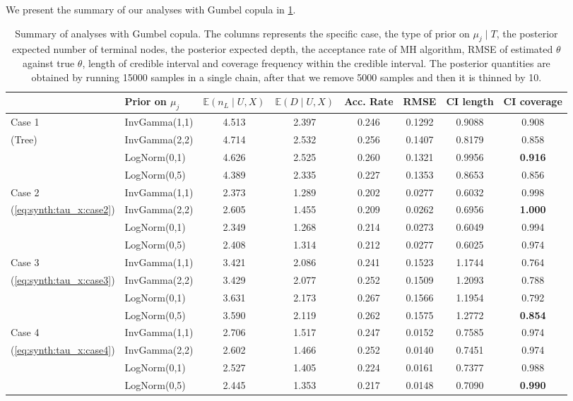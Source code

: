 \documentclass{amsart}
\begin{document}
We present the summary of our analyses with Gumbel copula in \cref{tab:gumbel:summary}. 


\begin{table}[ht]
	\centering
	\caption{Summary of analyses with Gumbel copula. The columns represents the specific case, the type of prior on $\mu_j\mid T$, the posterior expected number of terminal nodes, the posterior expected depth, the acceptance rate of MH algorithm, RMSE of estimated $\theta$ against true $\theta$, length of credible interval and coverage frequency within the credible interval. The posterior quantities are obtained by running 15000 samples in a single chain, after that we remove 5000 samples and then it is thinned by 10.}
	\label{tab:gumbel:summary}
	\scriptsize{
	\begin{tabular}{ll|cccccc}
		\toprule
		& Prior on $\mu_j$ & $\mathbb{E}(n_L\mid U,X)$ & $\mathbb{E}(D\mid U,X)$ & Acc. Rate & RMSE & CI length & CI coverage \\ 
		\midrule
		Case 1 & InvGamma(1,1) & 4.513 & 2.397 & 0.246 & 0.1292 & 0.9088 & 0.908 \\ 
		(Tree) & InvGamma(2,2) & 4.714 & 2.532 & 0.256 & 0.1407 & 0.8179 & 0.858 \\ 
		& LogNorm(0,1) & 4.626 & 2.525 & 0.260 & 0.1321 & 0.9956 & \textbf{0.916} \\ 
		& LogNorm(0,5) & 4.389 & 2.335 & 0.227 & 0.1353 & 0.8653 & 0.856 \\ 
		\midrule
		Case 2 & InvGamma(1,1) & 2.373 & 1.289 & 0.202 & 0.0277 & 0.6032 & 0.998 \\ 
		(\cref{eq:synth:tau_x:case2}) & InvGamma(2,2) & 2.605 & 1.455 & 0.209 & 0.0262 & 0.6956 & \textbf{1.000} \\ 
		& LogNorm(0,1) & 2.349 & 1.268 & 0.214 & 0.0273 & 0.6049 & 0.994 \\ 
		& LogNorm(0,5) & 2.408 & 1.314 & 0.212 & 0.0277 & 0.6025 & 0.974 \\ 
		\midrule
		Case 3 & InvGamma(1,1) & 3.421 & 2.086 & 0.241 & 0.1523 & 1.1744 & 0.764 \\ 
		(\cref{eq:synth:tau_x:case3}) & InvGamma(2,2) & 3.429 & 2.077 & 0.252 & 0.1509 & 1.2093 & 0.788 \\ 
		& LogNorm(0,1) & 3.631 & 2.173 & 0.267 & 0.1566 & 1.1954 & 0.792 \\ 
		& LogNorm(0,5) & 3.590 & 2.119 & 0.262 & 0.1575 & 1.2772 & \textbf{0.854} \\ 
		\midrule
		Case 4 & InvGamma(1,1) & 2.706 & 1.517 & 0.247 & 0.0152 & 0.7585 & 0.974 \\ 
		(\cref{eq:synth:tau_x:case4}) & InvGamma(2,2) & 2.602 & 1.466 & 0.252 & 0.0140 & 0.7451 & 0.974 \\ 
		& LogNorm(0,1) & 2.527 & 1.405 & 0.224 & 0.0161 & 0.7377 & 0.988 \\ 
		& LogNorm(0,5) & 2.445 & 1.353 & 0.217 & 0.0148 & 0.7090 & \textbf{0.990} \\ 
		\end{tabular}}
\end{table}
\end{document}

